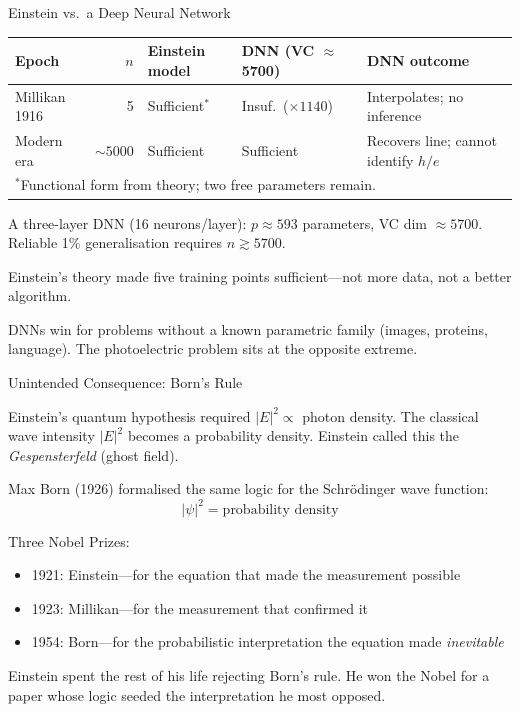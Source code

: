 \documentclass[aspectratio=169]{beamer}
\begin{document}
\begin{frame}{Einstein vs.\ a Deep Neural Network}

\begin{center}
\small
\begin{tabular}{p{2.5cm}rp{2.7cm}p{2.8cm}p{3.5cm}}
\toprule
Epoch & $n$ & Einstein model & DNN (VC $\approx$ 5700) & DNN outcome \\
\midrule
Millikan 1916 & 5  & Sufficient$^*$ & Insuf.\ ($\times 1140$) & Interpolates; no inference \\
Modern era    & $\sim 5000$ & Sufficient & Sufficient & Recovers line; cannot identify $h/e$ \\
\bottomrule
\multicolumn{5}{p{13cm}}{\small $^*$Functional form from theory; two free parameters remain.}
\end{tabular}
\end{center}

\medskip
A three-layer DNN (16 neurons/layer): $p \approx 593$ parameters,
VC dim $\approx 5700$. Reliable 1\% generalisation requires
$n \gtrsim 5700$.

\medskip
Einstein's theory made five training points sufficient---not more data,
not a better algorithm.

\medskip
DNNs win for problems without a known parametric family (images, proteins,
language). The photoelectric problem sits at the opposite extreme.

\end{frame}

\begin{frame}{Unintended Consequence: Born's Rule}

Einstein's quantum hypothesis required $|E|^2 \propto$ photon density.
The classical wave intensity $|E|^2$ becomes a probability density.
Einstein called this the \emph{Gespensterfeld} (ghost field).

\medskip
Max Born (1926) formalised the same logic for the Schr\"odinger wave function:
\[
  \boxed{|\psi|^2 = \text{probability density}}
\]

\medskip
Three Nobel Prizes:
\begin{itemize}
  \item 1921: Einstein---for the equation that made the measurement possible
  \item 1923: Millikan---for the measurement that confirmed it
  \item 1954: Born---for the probabilistic interpretation the equation made
    \emph{inevitable}
\end{itemize}

\medskip
Einstein spent the rest of his life rejecting Born's rule.
He won the Nobel for a paper whose logic seeded the interpretation he most
opposed.

\end{frame}
\end{document}
